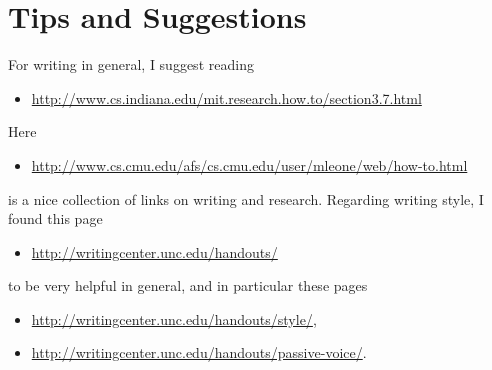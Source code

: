 \documentclass[twocolumn, a4paper, 10pt]{article}
\begin{document}
\section{Tips and Suggestions}
For writing in general, I suggest reading
\begin{itemize}
	\item \url{http://www.cs.indiana.edu/mit.research.how.to/section3.7.html}
\end{itemize}
Here
\begin{itemize}
	\item \url{http://www.cs.cmu.edu/afs/cs.cmu.edu/user/mleone/web/how-to.html}
\end{itemize}
is a nice collection of links on writing and research.
Regarding writing style, I found this page
\begin{itemize}
	\item \url{http://writingcenter.unc.edu/handouts/}
\end{itemize}
to be very helpful in general, and in particular these pages
\begin{itemize}
	\item \url{http://writingcenter.unc.edu/handouts/style/}, 
	\item \url{http://writingcenter.unc.edu/handouts/passive-voice/}.
\end{itemize}
\end{document}
